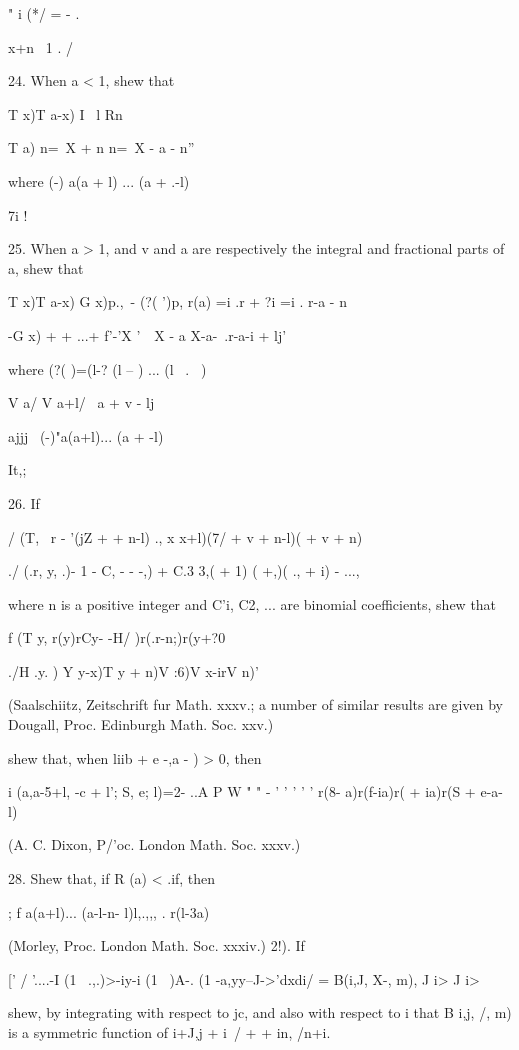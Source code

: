 " i (*/ = - . 

x+n \ 1 . /

24. When a < 1, shew that

T x)T a-x) I \ l Rn

T a) n=\ X + n n=\ X - a - n''

where (-) a(a + l) ... (a + .-l)

7i !

25. When a > 1, and v and a are respectively the integral and
fractional parts of a, shew that

T x)T a-x) G x)p.,\ - (?( ')p, r(a) =i .r + ?i =i . r-a - n

-G x) + + ...+ f'-'X '\ \ X - a X-a-\ .r-a-i + lj'

%
%

where (?( )=(l-? (l -- ) ... (l \ . \ )

V a/ V a+l/ \ a + v - lj

ajjj \ (-)"a(a+l)... (a + -l)

It,;

 26. If

/ (T, \ r - '(jZ + + n-l) ., x x+l)(7/ + v + n-l)( + v + n)

./ (.r, y, .)- 1 - C, - - -,) + C.3 3,( + 1) ( +,)( ., + i) - ...,

where n is a positive integer and C'i, C2, ... are binomial
coefficients, shew that

f (T y, r(y)rCy- -H/ )r(.r-n;)r(y+?0

./H .y. ) Y y-x)T y + n)V :6)V x-irV n)'

(Saalschiitz, Zeitschrift fur Math. xxxv.; a number of similar
results are given by Dougall, Proc. Edinburgh Math. Soc. xxv.)

shew that, when liib + e -,a - ) > 0, then

i (a,a-5+l, -c + l'; S, e; l)=2- ..A P W " " - ' ' ' ' ' r(8-
a)r(f-ia)r( + ia)r(S + e-a-l)

(A. C. Dixon, P/'oc. London Math. Soc. xxxv.)

28. Shew that, if R (a) < .if, then

; f a(a+l)... (a-l-n- l)l,.,,, . r(l-3a)

(Morley, Proc. London Math. Soc. xxxiv.) 2!). If

[' / '....-I (1 \ .,.)>-iy-i (1 \ )A-. (1 -a,yy--J->'dxdi/ = B(i,J,
X-, m), J i> J i>

shew, by integrating with respect to jc, and also with respect to i
that B i,j, /, m) is a symmetric function of i+J,j + i\ / + + in,
/n+i.

